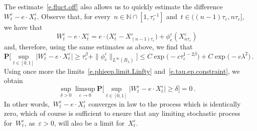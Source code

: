 \documentclass[11pt]{article} %
\numberwithin{equation}{section}
\theoremstyle{definition}
\newcommand*{\N}{\ensuremath{\mathbb{N}}}
\newcommand{\eps}{\varepsilon}
\newcommand{\ep}{\eps}
\begin{document}
\smallskip

The estimate~\eqref{e.fluct.off} also allows us to quickly estimate the difference~$W^\ep_t - e\cdot X^{\ep}_t$. 
Observe that, for every~$n\in \N\cap [1, \tau_\ep^{-1}]$ and~$t \in ( (n-1) \tau_\ep, n\tau_\ep]$, we have that 
\begin{equation*}
W^\ep_t - e\cdot X^{\ep}_t
=
e\cdot \bigl( X^\ep_t - X^\ep_{(n-1)\tau_\ep}\bigr) 
+
\phi_e^\ep(X^\ep_{n\tau_\ep })
\end{equation*}
and, therefore, using the same estimates as above, we find that 
\begin{equation*}
\mathbf{P} 
\biggl[ 
\sup_{ t \in [0,1] } 
\bigl| W^\ep_t - e\cdot X^{\ep}_t \bigr| 
\geq \tau_\ep^{\beta} + \| \phi^\ep_e\|_{L^\infty(B_\lambda)}
\biggr]
\leq 
C \exp \bigl( -c\tau_\ep^{1-2\beta} \bigr) 
+
C \exp \bigl( -c\lambda^2  \bigr)
\,.
\end{equation*}
Using once more the limits~\eqref{e.phieep.limit.Linfty} and~\eqref{e.tau.ep.constraint}, we obtain
\begin{equation}
\label{e.Wept.to.Xept}
\sup_{\delta>0} \limsup_{\ep \to 0}
\mathbf{P} 
\biggl[ 
\sup_{ t \in [0,1] } 
\bigl| W^\ep_t - e\cdot X^{\ep}_t \bigr| 
\geq \delta 
\biggr] = 0
\,.
\end{equation}
In other words,~$W^\ep_t - e\cdot X^\ep_t$ converges in law to the process which is identically zero, which of course is sufficient to ensure that any limiting stochastic process for~$W^\ep_t$, as~$\ep>0$, will also be a limit for~$X^\ep_t$. 

\smallskip
\end{document}
